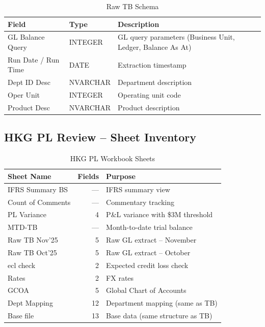 \documentclass[11pt,a4paper]{article}
\begin{document}
\begin{table}[H]
\centering
\caption{Raw TB Schema}
\begin{tabularx}{\textwidth}{llX}
\toprule
\textbf{Field} & \textbf{Type} & \textbf{Description} \\
\midrule
GL Balance Query & INTEGER & GL query parameters (Business Unit, Ledger, Balance As At) \\
Run Date / Run Time & DATE & Extraction timestamp \\
Dept ID Desc & NVARCHAR & Department description \\
Oper Unit & INTEGER & Operating unit code \\
Product Desc & NVARCHAR & Product description \\
\bottomrule
\end{tabularx}
\end{table}

\subsection{HKG PL Review -- Sheet Inventory}

\begin{table}[H]
\centering
\caption{HKG PL Workbook Sheets}
\begin{tabularx}{\textwidth}{lrX}
\toprule
\textbf{Sheet Name} & \textbf{Fields} & \textbf{Purpose} \\
\midrule
IFRS Summary BS   & ---  & IFRS summary view \\
Count of Comments  & ---  & Commentary tracking \\
PL Variance        & 4   & P\&L variance with \$3M threshold \\
MTD-TB             & ---  & Month-to-date trial balance \\
Raw TB Nov'25      & 5   & Raw GL extract -- November \\
Raw TB Oct'25      & 5   & Raw GL extract -- October \\
ecl check          & 2   & Expected credit loss check \\
Rates              & 2   & FX rates \\
GCOA               & 5   & Global Chart of Accounts \\
Dept Mapping       & 12  & Department mapping (same as TB) \\
Base file          & 13  & Base data (same structure as TB) \\
\bottomrule
\end{tabularx}
\end{table}
\end{document}
